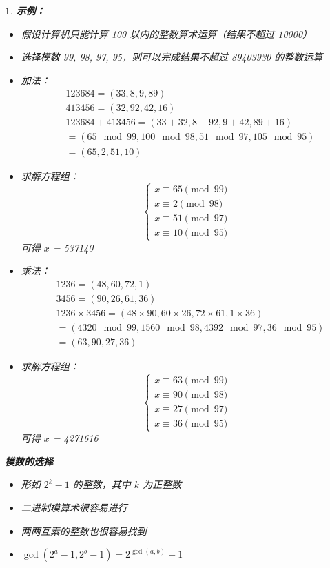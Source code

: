 \documentclass[UTF8]{report}
\theoremstyle{MyLineTheoremStyle} %
\theoremstyle{MyBlockTheoremStyle} %
\theoremstyle{MySubsubsectionStyle} %
\newtheorem{definition}{}
\begin{document}
\begin{definition}
    \textbf{示例：}
    \begin{itemize}
        \item 假设计算机只能计算 100 以内的整数算术运算（结果不超过 10000）
        \item 选择模数 99, 98, 97, 95，则可以完成结果不超过 89403930 的整数运算
        \item 加法：
        \[
        \begin{aligned}
            &123684 = (33, 8, 9, 89) \\
            &413456 = (32, 92, 42, 16) \\
            &123684 + 413456 = (33 + 32, 8 + 92, 9 + 42, 89 + 16) \\
            &= (65 \mod 99, 100 \mod 98, 51 \mod 97, 105 \mod 95) \\
            &= (65, 2, 51, 10)
        \end{aligned}
        \]
        \item 求解方程组：
        \[
        \begin{cases}
            x \equiv 65 \pmod{99} \\
            x \equiv 2 \pmod{98} \\
            x \equiv 51 \pmod{97} \\
            x \equiv 10 \pmod{95}
        \end{cases}
        \]
        可得 $x$ = 537140
        \item 乘法：
        \[
        \begin{aligned}
            &1236 = (48, 60, 72, 1) \\
            &3456 = (90, 26, 61, 36) \\
            &1236 \times 3456 = (48 \times 90, 60 \times 26, 72 \times 61, 1 \times 36) \\
            &= (4320 \mod 99, 1560 \mod 98, 4392 \mod 97, 36 \mod 95) \\
            &= (63, 90, 27, 36)
        \end{aligned}
        \]
        \item 求解方程组：
        \[
        \begin{cases}
            x \equiv 63 \pmod{99} \\
            x \equiv 90 \pmod{98} \\
            x \equiv 27 \pmod{97} \\
            x \equiv 36 \pmod{95}
        \end{cases}
        \]
        可得 $x$ = 4271616
    \end{itemize}

    \textbf{模数的选择}
    \begin{itemize}
        \item 形如 $2^k - 1$ 的整数，其中 $k$ 为正整数
        \item 二进制模算术很容易进行
        \item 两两互素的整数也很容易找到
        \item $\gcd(2^a - 1, 2^b - 1) = 2^{\gcd(a, b)} - 1$
    \end{itemize}
\end{definition}
\end{document}
